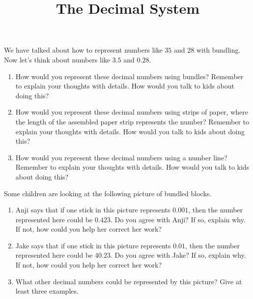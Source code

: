 \documentclass{ximera}
\title{The Decimal System}
\begin{document}
\begin{abstract}\end{abstract}
\maketitle


\begin{problem}
We have talked about how to represent numbers like $35$ and $28$ with bundling. Now let's think about numbers like $3.5$ and $0.28$.

\begin{enumerate}
	\item How would you represent these decimal numbers using bundles? Remember to explain your thoughts with details. How would you talk to kids about doing this?
	\item How would you represent these decimal numbers using strips of paper, where the length of the assembled paper strip represents the number? Remember to explain your thoughts with details. How would you talk to kids about doing this?
	\item How would you represent these decimal numbers using a number line? Remember to explain your thoughts with details. How would you talk to kids about doing this?
\end{enumerate}
\end{problem}


\begin{problem}
 Some children are looking at the following picture of bundled blocks.
\begin{center}
\end{center}
\begin{enumerate}
\item Anji says that if one stick in this picture represents $0.001$, then the number represented here could be $0.423$. Do you agree with Anji? If so, explain why. If not, how could you help her correct her work?
\item Jake says that if one stick in this picture represents $0.01$, then the number represented here could be $40.23$. Do you agree with Jake? If so, explain why. If not, how could you help her correct her work?
\item What other decimal numbers could be represented by this picture? Give at least three examples.
\end{enumerate}
\end{problem}
\end{document}
